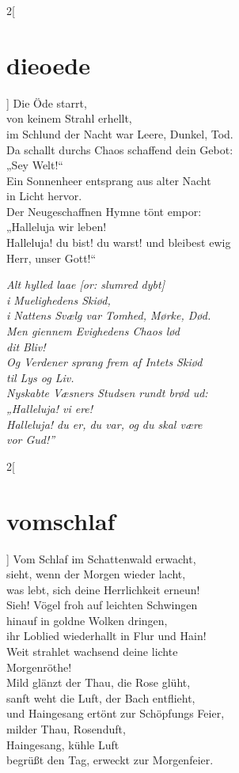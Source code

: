 \documentclass[shorttitlesize=45,tocstyle=ref]{ees}
\begin{document}
{\begin{multicols}{2}[\section{dieoede}]
Die Öde starrt,\\
von keinem Strahl erhellt,\\
im Schlund der Nacht war Leere, Dunkel, Tod.\\
Da schallt durchs Chaos schaffend dein Gebot:\\
„Sey Welt!“\\
Ein Sonnenheer entsprang aus alter Nacht\\
in Licht hervor.\\
Der Neugeschaffnen Hymne tönt empor:\\
„Halleluja wir leben!\\
Halleluja! du bist! du warst! und bleibest ewig\\
Herr, unser Gott!“

\columnbreak
\itshape
Alt hylled laae [\textit{or}: slumred dybt]\\
i Muelighedens Skiød,\\
i Nattens Svælg var Tomhed, Mørke, Død.\\
Men giennem Evighedens Chaos lød\\
dit Bliv!\\
Og Verdener sprang frem af Intets Skiød\\
til Lys og Liv.\\
Nyskabte Væsners Studsen rundt brød ud:\\
„Halleluja! vi ere!\\
Halleluja! du er, du var, og du skal være\\
vor Gud!”
\end{multicols}

\begin{multicols}{2}[\section{vomschlaf}]
Vom Schlaf im Schattenwald erwacht,\\
sieht, wenn der Morgen wieder lacht,\\
was lebt, sich deine Herrlichkeit erneun!\\
Sieh! Vögel froh auf leichten Schwingen\\
hinauf in goldne Wolken dringen,\\
ihr Loblied wiederhallt in Flur und Hain!\\
Weit strahlet wachsend deine lichte\\
\hspace*{1em}Morgenröthe!\\
Mild glänzt der Thau, die Rose glüht,\\
sanft weht die Luft, der Bach entflieht,\\
und Haingesang ertönt zur Schöpfungs Feier,\\
milder Thau, Rosenduft,\\
Haingesang, kühle Luft\\
begrüßt den Tag, erweckt zur Morgenfeier.


\end{multicols}}
\end{document}

